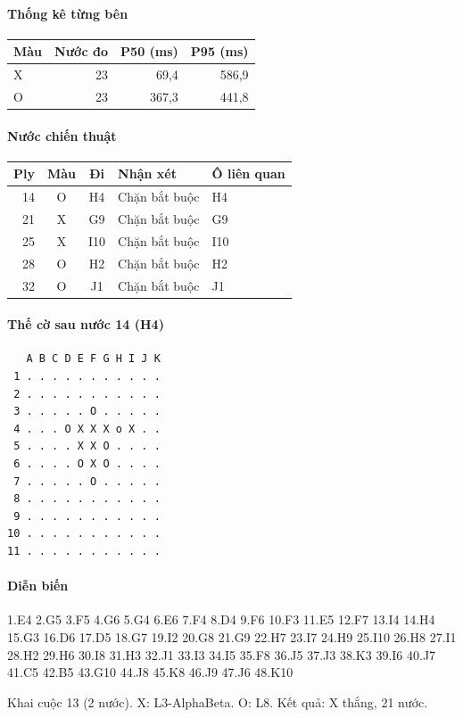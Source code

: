 \paragraph{Thống kê từng bên}
\begin{center}\small
\begin{tabular}{@{}lrrr@{}}
\toprule
Màu & Nước đo & P50 (ms) & P95 (ms) \\
\midrule
X & 23 & 69,4 & 586,9 \\
O & 23 & 367,3 & 441,8 \\
\bottomrule
\end{tabular}
\end{center}
\paragraph{Nước chiến thuật}
\begin{center}\small
\begin{tabular}{@{}rccll@{}}
\toprule
Ply & Màu & Đi & Nhận xét & Ô liên quan \\
\midrule
14 & O & H4 & Chặn bắt buộc & H4 \\
21 & X & G9 & Chặn bắt buộc & G9 \\
25 & X & I10 & Chặn bắt buộc & I10 \\
28 & O & H2 & Chặn bắt buộc & H2 \\
32 & O & J1 & Chặn bắt buộc & J1 \\
\bottomrule
\end{tabular}
\end{center}
\paragraph{Thế cờ sau nước 14 (H4)}
\begin{verbatim}
   A B C D E F G H I J K
 1 . . . . . . . . . . .
 2 . . . . . . . . . . .
 3 . . . . . O . . . . .
 4 . . . O X X X o X . .
 5 . . . . X X O . . . .
 6 . . . . O X O . . . .
 7 . . . . . O . . . . .
 8 . . . . . . . . . . .
 9 . . . . . . . . . . .
10 . . . . . . . . . . .
11 . . . . . . . . . . .
\end{verbatim}
\paragraph{Diễn biến}
{\footnotesize 1.E4 2.G5 3.F5 4.G6 5.G4 6.E6 7.F4 8.D4 9.F6 10.F3 11.E5 12.F7 13.I4 14.H4 15.G3 16.D6 17.D5 18.G7 19.I2 20.G8 21.G9 22.H7 23.I7 24.H9 25.I10 26.H8 27.I1 28.H2 29.H6 30.I8 31.H3 32.J1 33.I3 34.I5 35.F8 36.J5 37.J3 38.K3 39.I6 40.J7 41.C5 42.B5 43.G10 44.J8 45.K8 46.J9 47.J6 48.K10\par}
Khai cuộc 13 (2 nước). X: L3-AlphaBeta. O: L8. Kết quả: X thắng, 21 nước.
